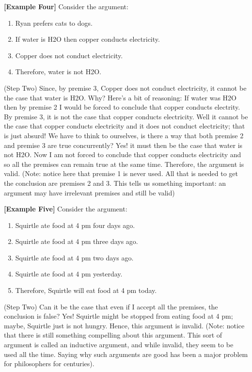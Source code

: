 \documentclass[
]{book}
\providecommand{\tightlist}{%
  \setlength{\itemsep}{0pt}\setlength{\parskip}{0pt}}
\begin{document}
\textbf{{[}Example Four{]}} Consider the argument:

\begin{enumerate}
\def\labelenumi{\arabic{enumi}.}
\tightlist
\item
  Ryan prefers cats to dogs.
\item
  If water is H2O then copper conducts electricity.
\item
  Copper does not conduct electricity.
\item
  Therefore, water is not H2O.
\end{enumerate}

(Step Two) Since, by premise 3, Copper does not conduct electricity, it cannot be the case that water is H2O. Why? Here's a bit of reasoning: If water was H2O then by premise 2 I would be forced to conclude that copper conducts electrity. By premise 3, it is not the case that copper conducts electricity. Well it cannot be the case that copper conducts electricity and it does not conduct electricity; that is just absurd! We have to think to ourselves, is there a way that both premise 2 and premise 3 are true concurrently? Yes! it must then be the case that water is not H2O. Now I am not forced to conclude that copper conducts electricity and so all the premises can remain true at the same time. Therefore, the argument is valid. (Note: notice here that premise 1 is never used. All that is needed to get the conclusion are premises 2 and 3. This tells us something important: an argument may have irrelevant premises and still be valid)

\textbf{{[}Example Five{]}} Consider the argument:

\begin{enumerate}
\def\labelenumi{\arabic{enumi}.}
\tightlist
\item
  Squirtle ate food at 4 pm four days ago.
\item
  Squirtle ate food at 4 pm three days ago.
\item
  Squirtle ate food at 4 pm two days ago.
\item
  Squirtle ate food at 4 pm yesterday.
\item
  Therefore, Squirtle will eat food at 4 pm today.
\end{enumerate}

(Step Two) Can it be the case that even if I accept all the premises, the conclusion is false? Yes! Squirtle might be stopped from eating food at 4 pm; maybe, Squirtle just is not hungry. Hence, this argument is invalid. (Note: notice that there is still something compelling about this argument. This sort of argument is called an inductive argument, and while invalid, they seem to be used all the time. Saying why such arguments are good has been a major problem for philosophers for centuries).
\end{document}
